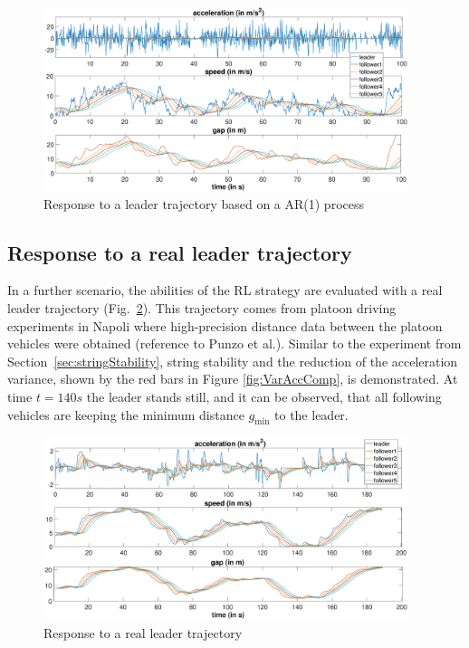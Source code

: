 \documentclass[review]{elsarticle}
\providecommand{\sub}[1]{_{\mathrm{#1}}}  %
\providecommand{\3}{{\ss}}
\begin{document}
\begin{figure}
	\centering
	\includegraphics[width=0.95\textwidth]{images/AR1Kolonne}
	\caption{Response to a leader trajectory based on a AR(1) process}
	\label{fig:AR1Kolonne}
\end{figure}


\subsection{Response to a real leader trajectory}

In a further scenario, the abilities of the RL strategy are evaluated
with a real leader trajectory (Fig.~\ref{fig:PunzoKolonne}). This
trajectory comes from platoon driving experiments in Napoli
where high-precision distance data between the platoon
vehicles were obtained (reference to Punzo et al.). Similar to the experiment from
Section~\ref{sec:stringStability}, string stability and the reduction
of  the acceleration variance, shown by the red bars in Figure
\ref{fig:VarAccComp}, is demonstrated. At time $t = 140s$ the leader
stands still, and it can be observed, that all following vehicles are
keeping the minimum distance $g\sub{min}$ to the leader.  


\begin{figure}
	\centering
	\includegraphics[width=0.95\textwidth]{images/PunzoKolonne}
	\caption{Response to a real leader trajectory}
	\label{fig:PunzoKolonne}
\end{figure}
\end{document}
